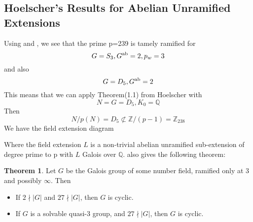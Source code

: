 \documentclass[12pt]{extarticle}
\newcommand{\<}{\langle}
\renewcommand{\>}{\rangle}
\theoremstyle{definition}
\newtheorem{theorem}{Theorem}
\begin{document}
\subsection{Hoelscher's Results for Abelian Unramified Extensions}
Using \cite{HOEL} and \cite{JONE}, we see that 
the prime p=239 is tamely ramified for 
\begin{equation}
  G=S_3,G\textsuperscript{ab} = 2, p_w =3  
\end{equation} and also 
\begin{equation}
    G=D_5,G\textsuperscript{ab} = 2 
\end{equation}
This means that we can apply Theorem(1.1) from Hoelscher with
\begin{equation}
    N = G = D_5, K_0 = \mathbb{Q}
\end{equation}
Then 
\begin{equation}
N/p(N) = D_5 \not\subset \mathbb{Z}/(p-1) = \mathbb{Z}_{238}
\end{equation}
We have the field extension diagram
\begin{center}
    
\end{center}
\par
Where the field extension $L$ is a non-trivial abelian unramified sub-extension of degree prime to p with $L$ Galois over $\mathbb{Q}$.
\cite{HOEL} also gives the following theorem: 
\begin{theorem}
Let $G$ be the Galois group of some number field, ramified only at 3 and possibly $\infty$. Then \begin{itemize}
\item If $2 \nmid |G|$ and $ 27 \nmid |G|$, then $G$ is cyclic.
\item If $G$ is a solvable quasi-3 group, and $ 27 \nmid |G|$, then $G$ is cyclic.
\end{itemize}
\end{theorem}
\end{document}
